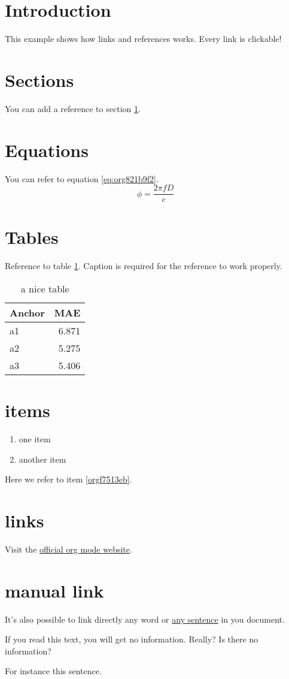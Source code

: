 


\section{Introduction}
\label{sec:org076ea41}
This example shows how links and references works.
Every link is clickable!

\section{Sections}
\label{sec:org18d196e}
You can add a reference to section \ref{sec:org076ea41}.

\section{Equations}
\label{sec:org3ac9943}
You can refer to equation \ref{eq:org821b9f2}.
\begin{equation}
\label{eq:org821b9f2}
\phi = \frac{2\pi fD}{c}
\end{equation}

\section{Tables}
\label{sec:org3b1476e}
Reference to table \ref{tab:org6f03a9b}.
Caption is required for the reference to work properly.

\begin{table}[htbp]
\caption{\label{tab:org6f03a9b}
a nice table}
\centering
\begin{tabular}{lr}
Anchor & MAE\\
\hline
a1 & 6.871\\
a2 & 5.275\\
a3 & 5.406\\
\end{tabular}
\end{table}

\section{items}
\label{sec:orga3a229d}
\begin{enumerate}
\item one item
\item \label{orgf7513eb}another item
\end{enumerate}
Here we refer to item \ref{orgf7513eb}.

\section{links}
\label{sec:org01439cf}
Visit the \href{https://orgmode.org/}{official org mode website}.

\section{manual link}
\label{sec:org3130774}
It's also possible to link directly any word
or \hyperlink{thesentence}{any sentence} in you document.

If you read this text, you will get no information.  Really?
Is there no information?

For instance \hypertarget{thesentence}{this sentence}.



